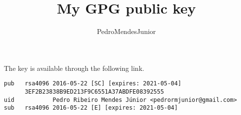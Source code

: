 

% 

\renewcommand\highlightauthorname[1]{#1}

\title{My GPG public key}
\author{\gls{PedroMendesJunior}\\%
}
\date{}



\maketitle

The key is available through the following link.

\begin{center}
\end{center}

\begin{verbatim}
pub   rsa4096 2016-05-22 [SC] [expires: 2021-05-04]
      3EF2B23838B9ED213F9C6551A37ABDFE08392555
uid           Pedro Ribeiro Mendes Júnior <pedrormjunior@gmail.com>
sub   rsa4096 2016-05-22 [E] [expires: 2021-05-04]
\end{verbatim}





